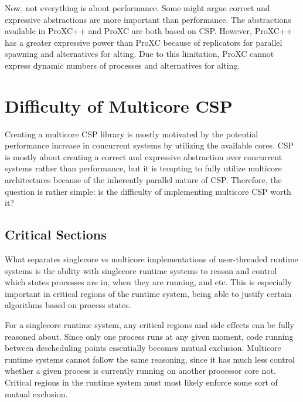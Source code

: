 Now, not everything is about performance. Some might argue correct and expressive abstractions are more important than performance. The abstractions available in ProXC++ and ProXC are both based on CSP. However, ProXC++ has a greater expressive power than ProXC because of replicators for parallel spawning and alternatives for alting. Due to this limitation, ProXC cannot express dynamic numbers of processes and alternatives for alting. 


\chapter{Difficulty of Multicore CSP}
\label{ch:difficulty_multicore_csp}

Creating a multicore CSP library is mostly motivated by the potential performance increase in concurrent systems by utilizing the available cores. CSP is mostly about creating a correct and expressive abstraction over concurrent systems rather than performance, but it is tempting to fully utilize multicore architectures because of the inherently parallel nature of CSP. Therefore, the question is rather simple: is the difficulty of implementing multicore CSP worth it?

\section{Critical Sections}

What separates singlecore vs multicore implementations of user\hyp{}threaded runtime systems is the ability with singlecore runtime systems to reason and control which states processes are in, when they are running, and etc. This is especially important in critical regions of the runtime system, being able to justify certain algorithms based on process states.

For a singlecore runtime system, any critical regions and side effects can be fully reasoned about. Since only one process runs at any given moment, code running between descheduling points essentially becomes mutual exclusion. Multicore runtime systems cannot follow the same reasoning, since it has much less control whether a given process is currently running on another processor core not. Critical regions in the runtime system must most likely enforce some sort of mutual exclusion. 

